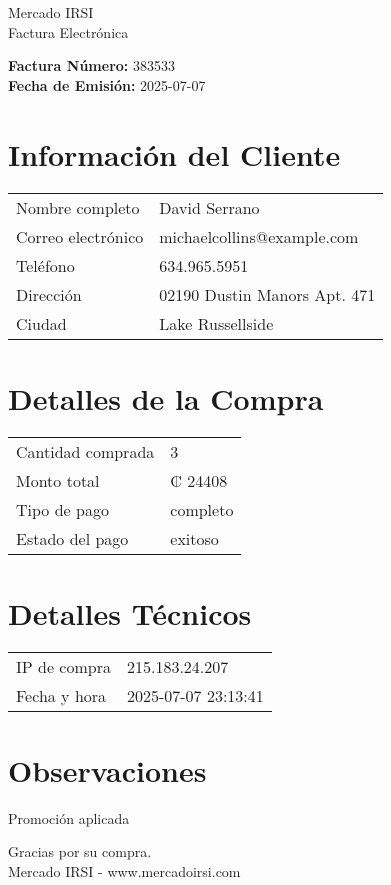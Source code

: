 \documentclass[12pt]{article}
\begin{document}
\begin{center}
    \Huge Mercado IRSI \\
    \Large Factura Electrónica
\end{center}

\vspace{0.5cm}

\noindent \textbf{Factura Número:} 383533 \\
\textbf{Fecha de Emisión:} 2025-07-07

\vspace{0.5cm}

\section*{Información del Cliente}
\begin{longtable}{ll}
Nombre completo & David Serrano \\
Correo electrónico & michaelcollins@example.com \\
Teléfono & 634.965.5951 \\
Dirección & 02190 Dustin Manors Apt. 471 \\
Ciudad & Lake Russellside \\
\end{longtable}

\vspace{0.5cm}

\section*{Detalles de la Compra}
\begin{longtable}{ll}
Cantidad comprada & 3 \\
Monto total & ₡ 24408 \\
Tipo de pago & completo \\
Estado del pago & exitoso \\
\end{longtable}

\vspace{0.5cm}

\section*{Detalles Técnicos}
\begin{longtable}{ll}
IP de compra & 215.183.24.207 \\
Fecha y hora & 2025-07-07 23:13:41 \\
\end{longtable}

\vspace{0.5cm}

\section*{Observaciones}
Promoción aplicada

\vspace{0.5cm}

\begin{center}
    Gracias por su compra. \\
    Mercado IRSI - www.mercadoirsi.com
\end{center}
\end{document}
